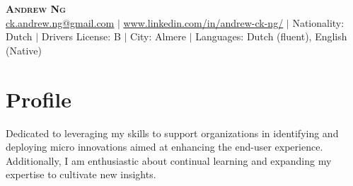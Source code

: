\documentclass[letterpaper,11pt]{article}
\begin{document}

\begin{center}
    \textbf{\Huge \scshape Andrew Ng} \\ \vspace{1pt}
    \href{mailto:x@x.com}{\underline{ck.andrew.ng@gmail.com}} $|$ 
    \href{https://linkedin.com/in/...}{\underline{www.linkedin.com/in/andrew-ck-ng/}} $|$
    \small Nationality: Dutch $|$ 
    {\small{Drivers License: B}} $|$  {\small{City: Almere}} $|$  
    {\small{Languages: Dutch (fluent), English (Native) }}
\end{center}

\section{Profile}
{\small{Dedicated to leveraging my skills to support organizations in identifying and deploying micro innovations aimed at enhancing the end-user experience. Additionally, I am enthusiastic about continual learning and expanding my expertise to cultivate new insights.}}


\end{document}
